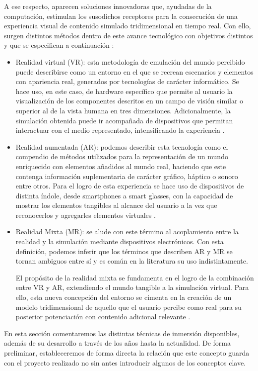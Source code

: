 A ese respecto, aparecen soluciones innovadoras que, ayudadas de la computación, estimulan los susodichos receptores para la consecución de una experiencia visual de contenido simulado tridimensional en tiempo real. Con ello, surgen distintos métodos dentro de este avance tecnológico con objetivos distintos y que se especifican a continuación :
\begin{itemize}
    \item Realidad virtual (VR): esta metodología de emulación del mundo percibido puede describirse como un entorno en el que se recrean escenarios y elementos con apariencia real, generados por tecnologías de carácter informático. Se hace uso, en este caso, de hardware  específico que permite al usuario la visualización de los componentes descritos en un campo de visión similar o superior al de la vista humana en tres dimensiones. Adicionalmente, la simulación obtenida puede ir acompañada de dispositivos que permitan interactuar con el medio representado, intensificando la experiencia \cite{16}.
    
    \item Realidad aumentada (AR): podemos describir esta tecnología como el compendio de métodos utilizados para la representación de un mundo enriquecido con elementos añadidos al mundo real, haciendo que este contenga información suplementaria de carácter gráfico, háptico o sonoro entre otros. Para el logro de esta experiencia se hace uso de dispositivos de distinta índole, desde smartphones a smart glasses, con la capacidad de mostrar los elementos tangibles al alcance del usuario a la vez que reconocerlos y agregarles elementos virtuales \cite{17}.  
    
    \item Realidad Mixta (MR): se alude con este término al acoplamiento entre  la realidad y la simulación mediante dispositivos electrónicos. Con esta definición, podemos inferir que los términos que describen AR y MR se tornan ambiguos entre sí y es común en la literatura su uso indistintamente.

    El propósito de la realidad mixta se fundamenta en el logro de la combinación entre VR  y AR, extendiendo el mundo tangible a la simulación virtual. Para ello, esta nueva concepción del entorno se cimenta en la creación de un modelo tridimensional de aquello que el usuario percibe como real para su posterior potenciación con contenido adicional relevante \cite{18}.
\end{itemize}

En esta sección comentaremos las distintas técnicas de inmersión disponibles, además de su desarrollo a través de los años hasta la actualidad. De forma preliminar,  estableceremos de forma directa la relación que este concepto guarda con el proyecto realizado no sin antes introducir algunos de los conceptos clave. 

